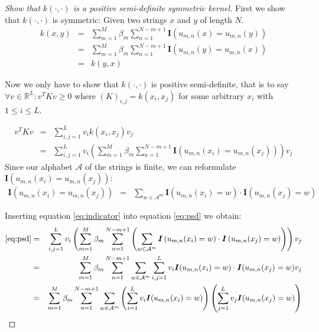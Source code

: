 \documentclass[a4paper, 12pt, titlepage]{article}
\begin{document}
\begin{proof}[Show that $k(\cdot,\cdot)$ is a positive semi-definite symmetric kernel]
First we show that $k(\cdot,\cdot)$ is symmetric:
Given two strings $x$ and $y$ of length $N$.
\begin{eqnarray*}
	k(x,y) &=& \sum_{m=1}^M\beta_m\sum_{n=1}^{N-m+1}\boldsymbol{I}\left(u_{m,n}(x)=u_{m,n}(y)\right)\\
	&=& \sum_{m=1}^M\beta_m\sum_{n=1}^{N-m+1}\boldsymbol{I}\left(u_{m,n}(y)=u_{m,n}(x)\right)\\
	&=& k(y,x)
\end{eqnarray*}

Now we only have to show that $k(\cdot,\cdot)$ is positive semi-definite, that is to say $\forall v\in \mathbb{R}^L: v^TKv\ge0$ where $(K)_{i,j}=k(x_i,x_j)$ for some arbitrary $x_i$ with $1\le i\le L$.

\begin{eqnarray}
	v^TKv &=& \sum_{i,j=1}^L v_i k(x_i,x_j) v_j \nonumber \\
	&=&  \sum_{i,j=1}^L v_i \left(\sum_{m=1}^M\beta_m\sum_{n=1}^{N-m+1}\boldsymbol{I}\left(u_{m,n}(x_i)=u_{m,n}(x_j)\right)\right)  v_j \label{eq:psd}
\end{eqnarray}
Since our alphabet $\mathcal{A}$ of the strings is finite, we can reformulate $\boldsymbol{I}\left(u_{m,n}(x_i)=u_{m,n}(x_j)\right)$:
\begin{eqnarray}
	\boldsymbol{I}\left(u_{m,n}(x_i)=u_{m,n}(x_j)\right) &=& \sum_{w\in\mathcal{A}^m} \boldsymbol{I}\left(u_{m,n}(x_i)=w\right)\cdot \boldsymbol{I}\left(u_{m,n}(x_j)=w\right) \label{eq:indicator}
\end{eqnarray}

Inserting equation \eqref{eq:indicator} into equation \eqref{eq:psd} we obtain:
\begin{eqnarray*}
	\eqref{eq:psd} &=& \sum_{i,j=1}^L v_i \left(\sum_{m=1}^M\beta_m\sum_{n=1}^{N-m+1}\left(\sum_{w\in\mathcal{A}^m} \boldsymbol{I}\left(u_{m,n}(x_i)=w\right)\cdot \boldsymbol{I}\left(u_{m,n}(x_j)=w\right)\right)\right)  v_j\\
	&=& \sum_{m=1}^{M}\beta_m\sum_{n=1}^{N-m+1}\sum_{w\in\mathcal{A}^m}\sum_{i,j=1}^L v_i \boldsymbol{I}(u_{m,n}(x_i)=w)\cdot \boldsymbol{I}(u_{m,n}(x_j)=w) v_j\\
	&=& \sum_{m=1}^{M}\beta_m\sum_{n=1}^{N-m+1}\sum_{w\in\mathcal{A}^m}\left(\sum_{i=1}^L v_i \boldsymbol{I}(u_{m,n}(x_i)=w)\right) \left(\sum_{j=1}^L v_j\boldsymbol{I}(u_{m,n}(x_j)=w)\right) \label{eq:psd2}
\end{eqnarray*}


\end{proof}
\end{document}
